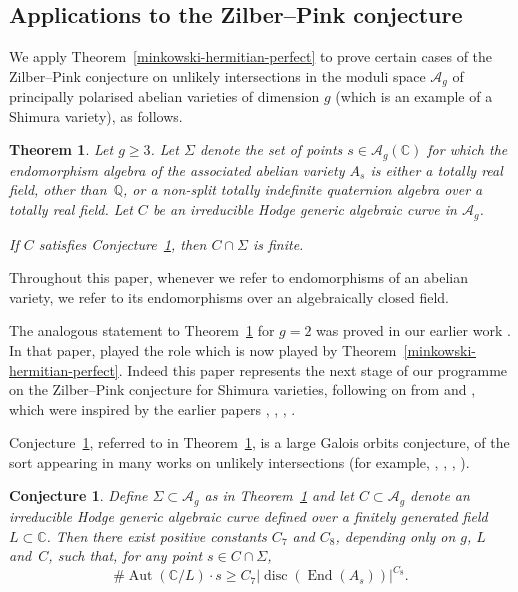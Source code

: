 \documentclass[JEP,XML,SOM,Unicode,NoFloatCountersInSection]{cedram}
\newcommand{\bC}{\mathbb{C}}
\newcommand{\bQ}{\mathbb{Q}}
\newcommand{\cA}{\mathcal{A}}
\newcommand{\Ag}{\mathcal{A}_g}
\DeclareMathOperator{\Aut}{Aut}
\DeclareMathOperator{\disc}{disc}
\DeclareMathOperator{\End}{End}
\newcommand{\abs}[1]{\lvert #1 \rvert}
\newtheorem{theorem}[lemma]{Theorem}
\newtheorem{conjecture}[lemma]{Conjecture}
\begin{document}
\subsection{Applications to the Zilber--Pink conjecture} \label{subsec:intro-zp-theorem}

We apply Theorem~\ref{minkowski-hermitian-perfect} to prove certain cases of the Zilber--Pink conjecture on unlikely intersections in the moduli space $\cA_g$ of principally polarised abelian varieties of dimension $g$ (which is an example of a Shimura variety), as follows.

\begin{theorem} \label{main-theorem-zp}
Let $g \geq 3$.
Let $\Sigma$ denote the set of points $s \in \Ag(\bC)$ for which the endomorphism algebra of the associated abelian variety $A_s$ is either a totally real field, other than~$\bQ$, or a non-split totally indefinite quaternion algebra over a totally real field.
Let $C$ be an irreducible Hodge generic algebraic curve in $\Ag$.

If $C$ satisfies Conjecture~\ref{galois-orbits}, then $C \cap \Sigma$ is finite.
\end{theorem}

Throughout this paper, whenever we refer to endomorphisms of an abelian variety, we refer to its endomorphisms over an algebraically closed field.

The analogous statement to Theorem~\ref{main-theorem-zp} for $g=2$ was proved in our earlier work \cite{QRTUI}.
In that paper, \cite[Lem.\,5.7]{QRTUI} played the role which is now played by Theorem~\ref{minkowski-hermitian-perfect}.
Indeed this paper represents the next stage of our programme on the Zilber--Pink conjecture for Shimura varieties, following on from \cite{ExCM} and \cite{QRTUI}, which were inspired by the earlier papers \cite{HP12}, \cite{HP16}, \cite{DR18}, \cite{OrrUI}.

Conjecture~\ref{galois-orbits}, referred to in Theorem~\ref{main-theorem-zp}, is a large Galois orbits conjecture, of the sort appearing in many works on unlikely intersections (for example, \cite[Conj.\,2.7]{Ull14}, \cite[Conj.\,8.2]{HP16}, \cite[Conj.\,11.1]{DR18}, \cite[Conj.\,6.2]{QRTUI}).

\begin{conjecture} \label{galois-orbits}
Define $\Sigma \subset \Ag$ as in Theorem~\ref{main-theorem-zp} and let $C\subset\cA_g$ denote an irreducible Hodge generic algebraic curve defined over a finitely generated field $L \subset \bC$.
Then there exist positive constants $C_{7}$ and $C_{8}$, depending only on $g$, $L$ and~$C$, such that, for any point $s \in C \cap \Sigma$,
\[
\# \Aut(\bC/L) \cdot s \geq C_{7} \abs{\disc(\End(A_s))}^{C_{8}}.
\]
\end{conjecture}
\end{document}
